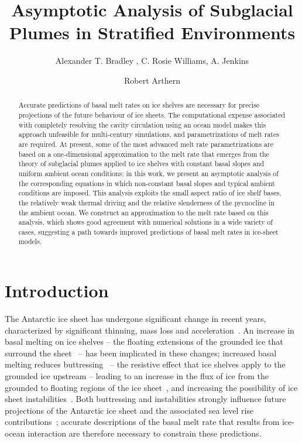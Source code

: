 \documentclass{jfm}
\title{Asymptotic Analysis of Subglacial Plumes in Stratified Environments}
\author{Alexander T. Bradley\aff{1}
  \corresp{\email{aleey@bas.ac.uk}},
  C. Rosie Williams\aff{1},
  A. Jenkins\aff{2}
 \and Robert Arthern\aff{1}}
\affiliation{\aff{1}British Antarctic Survey, High Cross, Madingley Road, Cambridge CB3 0ET, UK, \aff{2}Department of Geography and Environmental Sciences, Northumbria University, Newcastle upon Tyne, UK. }
\begin{document}
\maketitle

\begin{abstract}
Accurate predictions of basal melt rates on ice shelves are necessary for precise projections of the future behaviour of ice sheets. The computational expense associated with completely resolving the cavity circulation using an ocean model makes this approach unfeasible for multi-century simulations, and parametrizations of melt rates are required. At present, some of the most advanced melt rate parametrizations are based on a one-dimensional approximation to the melt rate that emerges from the theory of subglacial plumes applied to ice shelves with constant basal slopes and uniform ambient ocean conditions; in this work, we present an asymptotic analysis of the corresponding equations in which non-constant basal slopes and typical ambient conditions are imposed. This analysis exploits the small aspect ratio of ice shelf bases, the relatively weak thermal driving and the relative slenderness of the pycnocline in the ambient ocean. We construct an approximation to the melt rate based on this analysis, which shows good agreement with numerical solutions in a wide variety of cases, suggesting a path towards improved predictions of basal melt rates in ice-sheet models.
\end{abstract}


\graphicspath{{./figures/}}
\section{Introduction}\label{S:Introduction}
The Antarctic ice sheet has undergone significant change in recent years, characterized by significant thinning, mass loss and acceleration~\citep{Pritchard2012Nature,Mouginot2014GRL, Paolo2015Science}. An increase in basal melting on ice shelves -- the floating extensions of the grounded ice that surround the sheet~\citep{Jenkins2010NatureGeo, Hellmer2012Nature} -- has been implicated in these changes; increased basal melting reduces buttressing~\citep{Gagliardini2010GRL, Goldberg2019GRL} -- the resistive effect that ice shelves apply to the grounded ice upstream -- leading to an increase in the flux of ice from the grounded to floating regions of the ice sheet~\citep{Gudmundsson2013Cryo},  and increasing the possibility of ice sheet instabilities~\citep{Schoof2007JGeophysResEarth,Vaughan2007Science}. Both buttressing and instabilities strongly influence future projections of the Antarctic ice sheet and the associated sea level rise contributions~\citep{DeConto2016Nature, Arthern2017GRL}; accurate descriptions of the basal melt rate that results from ice-ocean interaction are therefore necessary to constrain these predictions. 
\end{document}
